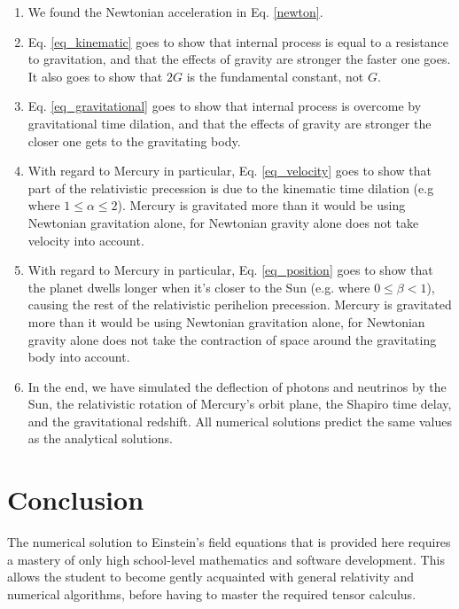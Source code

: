 \documentclass[12pt]{article}
\begin{document}
\begin{enumerate}
\item
We found the Newtonian acceleration in Eq. \ref{newton}.

\item
Eq. \ref{eq_kinematic} goes to show that internal process is equal to a resistance to gravitation, and that the effects of gravity are stronger the faster one goes.
It also goes to show that $2G$ is the fundamental constant, not $G$.

\item
Eq. \ref{eq_gravitational} goes to show that internal process is overcome by gravitational time dilation, and that the effects of gravity are stronger the closer one gets to the gravitating body.

\item
With regard to Mercury in particular, Eq. \ref{eq_velocity} goes to show that part of the relativistic precession is due to the kinematic time dilation (e.g where $1 \leq \alpha \leq 2$). 
Mercury is gravitated more than it would be using Newtonian gravitation alone, for Newtonian gravity alone does not take velocity into account.

\item
With regard to Mercury in particular, Eq. \ref{eq_position} goes to show that the planet dwells longer when it's closer to the Sun (e.g. where $0 \leq \beta < 1$), causing the rest of the relativistic perihelion precession. 
Mercury is gravitated more than it would be using Newtonian gravitation alone, for Newtonian gravity alone does not take the contraction of space around the gravitating body into account.

\item
In the end, we have simulated the deflection of photons and neutrinos by the Sun, the relativistic rotation of Mercury's orbit plane, the Shapiro time delay, and the gravitational redshift.
All numerical solutions predict the same values as the analytical solutions.

\end{enumerate}







\section{Conclusion}

The numerical solution to Einstein's field equations that is provided here requires a mastery of only high school-level mathematics and software development.
This allows the student to become gently acquainted with general relativity and numerical algorithms, before having to master the required tensor calculus.
\end{document}
